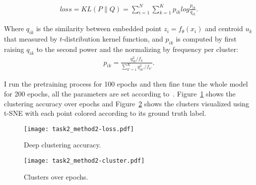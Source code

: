 \documentclass{article}
\begin{document}
\begin{align*}
  loss = KL(P\|Q)=\sum_{i=1}^{N}\sum_{k=1}^{K}p_{ik}log\frac{p_{ik}}{q_{ik}}.
\end{align*}

Where $q_{ik}$ is the similarity between embedded point $z_i=f_\theta(x_i)$ and centroid $u_k$ that measured by $t$-distribution kernel function, and $p_{ik}$ is computed by first raising $q_{ik}$ to the second power and the normalizing by frequency per cluster:
\begin{align*}
  p_{ik} = \frac{q_{ik}^2/f_k}{\sum_{k'=1}^{K}q_{ik'}^2/f_{k'}}.
\end{align*}

I run the pretraining process for 100 epochs and then fine tune the whole model for 200 epochs, all the parameters are set according to~\cite{xie2016unsupervised}. Figure~\ref{fig:task2-loss} shows the clustering accuracy over epochs and Figure~\ref{fig:task2-cluster} shows the clusters visualized using t-SNE with each point colored according to its ground truth label.
\begin{figure}[!h]
  \centering
  \texttt{[image: task2\_method2-loss.pdf]}
  \caption{Deep clustering accuracy.}
  \label{fig:task2-loss}
\end{figure}

\begin{figure}[!h]
  \centering
  \texttt{[image: task2\_method2-cluster.pdf]}
  \caption{Clusters over epochs.}
  \label{fig:task2-cluster}
\end{figure}



\end{document}
